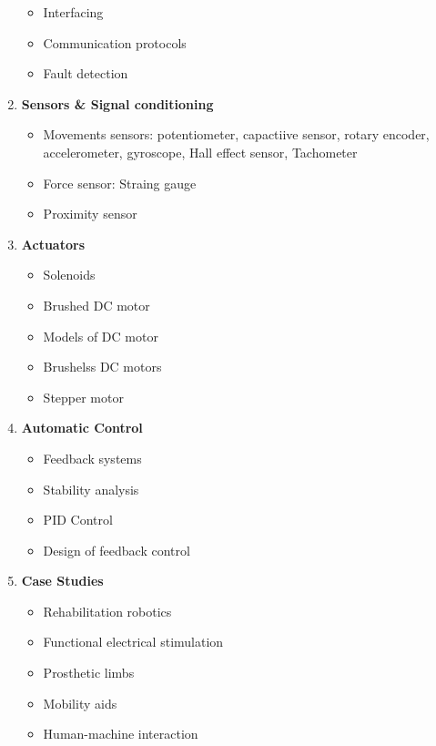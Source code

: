 \begin{enumerate}
\begin{itemize}
        \item Interfacing
        \item Communication protocols
        \item Fault detection
    \end{itemize}
    \item \textbf{Sensors \& Signal conditioning}
    \begin{itemize}
        \item Movements sensors: potentiometer, capactiive sensor, rotary encoder, accelerometer, gyroscope, Hall effect sensor, Tachometer
        \item Force sensor: Straing gauge
        \item Proximity sensor
    \end{itemize}
    \item \textbf{Actuators}
    \begin{itemize}
        \item Solenoids
        \item Brushed DC motor
        \item Models of DC motor
        \item Brushelss DC motors
        \item Stepper motor
    \end{itemize}
    \item \textbf{Automatic Control}
    \begin{itemize}
        \item Feedback systems
        \item Stability analysis
        \item PID Control
        \item Design of feedback control
    \end{itemize}
    \item \textbf{Case Studies}
    \begin{itemize}
        \item Rehabilitation robotics
        \
        \item Functional electrical stimulation
        \item Prosthetic limbs
        \item Mobility aids
        \item Human-machine interaction
    \end{itemize}
\end{enumerate}
